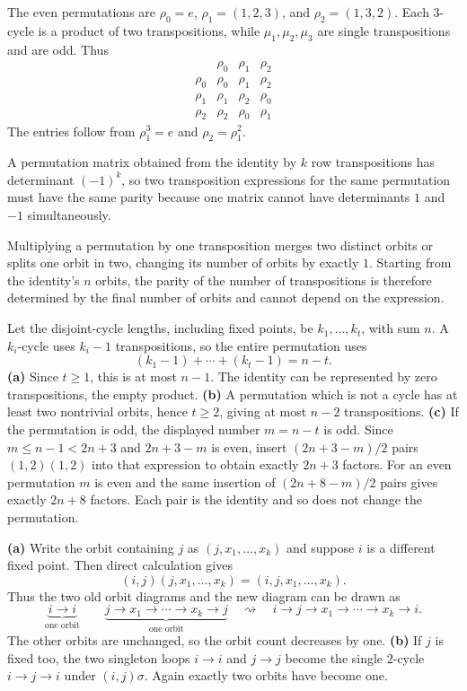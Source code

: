 The even permutations are $\rho_0=e$, $\rho_1=(1,2,3)$, and $\rho_2=(1,3,2)$. Each $3$-cycle is a product of two transpositions, while $\mu_1,\mu_2,\mu_3$ are single transpositions and are odd. Thus
\[\begin{array}{c|ccc}&\rho_0&\rho_1&\rho_2\\\hline
\rho_0&\rho_0&\rho_1&\rho_2\\
\rho_1&\rho_1&\rho_2&\rho_0\\
\rho_2&\rho_2&\rho_0&\rho_1
\end{array}\]
The entries follow from $\rho_1^3=e$ and $\rho_2=\rho_1^2$.

A permutation matrix obtained from the identity by $k$ row transpositions has determinant $(-1)^k$, so two transposition expressions for the same permutation must have the same parity because one matrix cannot have determinants $1$ and $-1$ simultaneously.

Multiplying a permutation by one transposition merges two distinct orbits or splits one orbit in two, changing its number of orbits by exactly $1$. Starting from the identity's $n$ orbits, the parity of the number of transpositions is therefore determined by the final number of orbits and cannot depend on the expression.

Let the disjoint-cycle lengths, including fixed points, be $k_1,\ldots,k_t$, with sum $n$. A $k_i$-cycle uses $k_i-1$ transpositions, so the entire permutation uses
\[(k_1-1)+\cdots+(k_t-1)=n-t.\]
\textbf{(a)} Since $t\ge1$, this is at most $n-1$. The identity can be represented by zero transpositions, the empty product.
\textbf{(b)} A permutation which is not a cycle has at least two nontrivial orbits, hence $t\ge2$, giving at most $n-2$ transpositions.
\textbf{(c)} If the permutation is odd, the displayed number $m=n-t$ is odd. Since $m\le n-1<2n+3$ and $2n+3-m$ is even, insert $(2n+3-m)/2$ pairs $(1,2)(1,2)$ into that expression to obtain exactly $2n+3$ factors. For an even permutation $m$ is even and the same insertion of $(2n+8-m)/2$ pairs gives exactly $2n+8$ factors. Each pair is the identity and so does not change the permutation.

\textbf{(a)} Write the orbit containing $j$ as $(j,x_1,\ldots,x_k)$ and suppose $i$ is a different fixed point. Then direct calculation gives
\[(i,j)(j,x_1,\ldots,x_k)=(i,j,x_1,\ldots,x_k).\]
Thus the two old orbit diagrams and the new diagram can be drawn as
\[\underbrace{i\longrightarrow i}_{\text{one orbit}}\qquad
\underbrace{j\longrightarrow x_1\longrightarrow\cdots\longrightarrow x_k\longrightarrow j}_{\text{one orbit}}
\quad\rightsquigarrow\quad
 i\longrightarrow j\longrightarrow x_1\longrightarrow\cdots\longrightarrow x_k\longrightarrow i.
\]
The other orbits are unchanged, so the orbit count decreases by one.
\textbf{(b)} If $j$ is fixed too, the two singleton loops $i\to i$ and $j\to j$ become the single $2$-cycle $i\to j\to i$ under $(i,j)\sigma$. Again exactly two orbits have become one.

